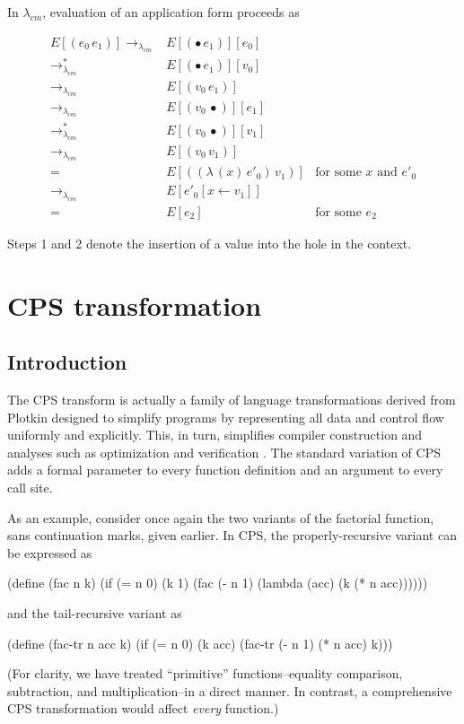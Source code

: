 \documentclass[ms,electronic,twosidetoc,letterpaper,chaptercenter,parttop]{byumsphd}
\newcommand{\cm}{$\lambda_{cm}$}
\newcommand{\cmrr}{\rightarrow_{\lambda_{cm}}}
\newcommand{\cmrrs}{\rightarrow_{\lambda_{cm}}^{*}}
\newcommand{\abs}[2]{(\lambda\,(#1)\,#2)}
\newcommand{\app}[2]{(#1\,#2)}
\newcommand{\hole}{\bullet}
\begin{document}




In \cm, evaluation of an application form proceeds as

\begin{align*}
E[\app{e_0}{e_1}]\cmrr &E[\app{\hole}{e_1}][e_0]\\
                \cmrrs &E[\app{\hole}{e_1}][v_0]\\
                 \cmrr &E[\app{v_0}{e_1}]\tag{1}\\
                 \cmrr &E[\app{v_0}{\hole}][e_1]\\
                \cmrrs &E[\app{v_0}{\hole}][v_1]\\
                 \cmrr &E[\app{v_0}{v_1}]\tag{2}\\
                     = &E[\app{\abs{x}{e'_0}}{v_1}] &\text{for some $x$ and $e'_0$}\\
                 \cmrr &E[e'_0[x\leftarrow v_1]]\\
                     = &E[e_2] &\text{for some $e_2$}
\end{align*}

Steps 1 and 2 denote the insertion of a value into the hole in the context.

\chapter{CPS transformation}

\section{Introduction}

The CPS transform is actually a family of language transformations derived from Plotkin
\cite{plotkin1975call} designed to simplify  programs by representing all data and control
flow uniformly and explicitly. This, in turn, simplifies compiler construction and
analyses such as optimization and verification \cite{sabry1994formal}. The standard
variation of CPS adds a formal parameter to every function definition and an argument to
every call site.

As an example, consider once again the two variants of the factorial function, sans
continuation marks, given earlier. In CPS, the properly-recursive variant can be expressed
as
\begin{schemedisplay}
(define (fac n k) 
  (if (= n 0)
      (k 1)
      (fac (- n 1) (lambda (acc) (k (* n acc))))))
\end{schemedisplay}
and the tail-recursive variant as
\begin{schemedisplay}
(define (fac-tr n acc k)
  (if (= n 0)
      (k acc)
      (fac-tr (- n 1) (* n acc) k)))
\end{schemedisplay}
(For clarity, we have treated ``primitive'' functions--equality comparison, subtraction,
and multiplication--in a direct manner. In contrast, a comprehensive CPS transformation
would affect \emph{every} function.)
\end{document}
